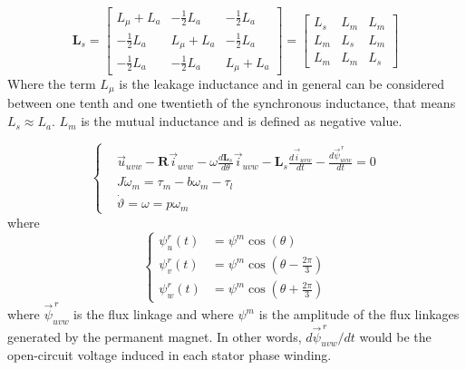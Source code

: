 \documentclass[11pt,a4paper]{article}
\numberwithin{equation}{section}
\theoremstyle{it}
\theoremstyle{definition}
\begin{document}
\begin{onehalfspace}
\begin{equation}
	\mathbf{L}_s = 
	\begin{bmatrix} 
		L_{\mu}+L_a & -\frac{1}{2}L_a & -\frac{1}{2}L_a \\[6pt]
		-\frac{1}{2}L_a & L_{\mu}+L_a & -\frac{1}{2}L_a \\[6pt]
		-\frac{1}{2}L_a & -\frac{1}{2}L_a & L_{\mu}+L_a
	\end{bmatrix} =
	\begin{bmatrix} 
		L_s & L_m & L_m \\[6pt]
		L_m & L_s & L_m \\[6pt]
		L_m & L_m & L_s
	\end{bmatrix}
\end{equation}
Where the term $L_{\mu}$ is the leakage inductance and in general can be considered between one tenth and one twentieth of the synchronous inductance, that means $L_s \approx L_a$. $L_m$ is the mutual inductance and is defined as negative value.

\begin{equation}\label{threephase_eq3}
	\left\lbrace \begin{aligned}
		& \vec{u}_{uvw}-\mathbf{R}\vec{i}_{uvw}-\omega\frac{d\mathbf{L}_s}{d\theta}\vec{i}_{uvw}-\mathbf{L}_s\frac{d\vec{i}_{uvw}}{dt}-\frac{d\vec{\psi}^{\,r}_{uvw}}{dt} = 0 \\[6pt]
		& J\dot{\omega}_m = \tau_m-b{\omega}_m-\tau_l \\[6pt]
		& \dot{\vartheta} = \omega =p\omega_m
	\end{aligned} \right. 
\end{equation}
where
\begin{equation}\label{magnet_flux}
	\left\lbrace \begin{aligned}
		\psi_u^r(t) &= \psi^m\cos(\theta) \\[6pt]
		\psi_v^r(t) &= \psi^m\cos(\theta-\frac{2\pi}{3}) \\[6pt]
		\psi_w^r(t) &= \psi^m\cos(\theta+\frac{2\pi}{3})
	\end{aligned} \right. 
\end{equation}
where $\vec{\psi}^{\,r}_{uvw}$ is the flux linkage and where $\psi^m$ is the amplitude of the flux linkages generated by the permanent magnet. In other words, $d\vec{\psi}^{\,r}_{uvw}/dt$ would be the open-circuit voltage induced in each stator phase winding. 


\end{onehalfspace}
\end{document}
